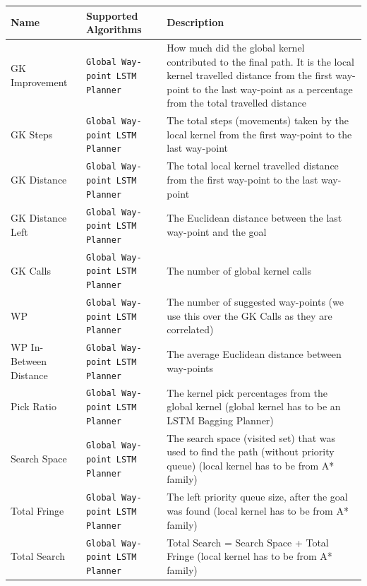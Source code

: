 \begin{table}[h!]
    \centerfloat
    \begin{tabular}{|M{2.7cm}|M{2.7cm}|M{8cm}|}
         \hline
         \textbf{Name} & \textbf{Supported Algorithms} & \textbf{Description} \\
         \hline
         GK Improvement & \texttt{Global Way-point LSTM Planner} & How much did the global kernel contributed to the final path. It is the local kernel travelled distance from the first way-point to the last way-point as a percentage from the total travelled distance \\
         \hline
         GK Steps & \texttt{Global Way-point LSTM Planner} & The total steps (movements) taken by the local kernel from the first way-point to the last way-point \\
         \hline
         GK Distance & \texttt{Global Way-point LSTM Planner} & The total local kernel travelled distance from the first way-point to the last way-point \\
         \hline
         GK Distance Left & \texttt{Global Way-point LSTM Planner} & The Euclidean distance between the last way-point and the goal  \\
         \hline
         GK Calls & \texttt{Global Way-point LSTM Planner} & The number of global kernel calls \\
         \hline
         WP & \texttt{Global Way-point LSTM Planner} & The number of suggested way-points (we use this over the GK Calls as they are correlated) \\
         \hline
         WP In-Between Distance & \texttt{Global Way-point LSTM Planner} & The average Euclidean distance between way-points \\
         \hline
         Pick Ratio & \texttt{Global Way-point LSTM Planner} & The kernel pick percentages from the global kernel (global kernel has to be an LSTM Bagging Planner) \\
         \hline
         Search Space & \texttt{Global Way-point LSTM Planner} & The search space (visited set) that was used to find the path (without priority queue) (local kernel has to be from A* family) \\
         \hline
         Total Fringe & \texttt{Global Way-point LSTM Planner} & The left priority queue size, after the goal was found (local kernel has to be from A* family) \\
         \hline
         Total Search & \texttt{Global Way-point LSTM Planner} & Total Search = Search Space + Total Fringe (local kernel has to be from A* family) \\

\end{tabular}
\end{table}
